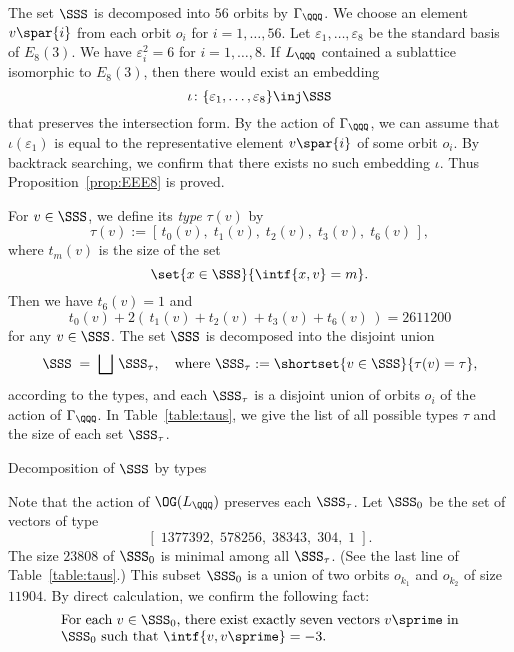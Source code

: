 \documentclass{amsart}
\begin{document}
%
\par
The set $\SSS$  is decomposed into $56$ orbits by $\Gamma_{\QQQ}$.
We choose an element $v\spar{i}$ from each orbit  $o_i$
for $i=1, \dots, 56$.
Let $\varepsilon_1, \dots, \varepsilon_8$ be the standard basis of $E_8(3)$.
We have  $\varepsilon_i^2=6$ for $i=1, \dots, 8$.
If $L_{\QQQ}$ contained a sublattice isomorphic to $E_8(3)$,
then there would exist an embedding
$$
\iota\colon \{\varepsilon_1, \dots, \varepsilon_8\}\inj \SSS
$$
that preserves the intersection form.
By the action of $\Gamma_{\QQQ}$,
we can assume that
$\iota(\varepsilon_1)$ is equal to the representative element $v\spar{i}$ of some orbit $o_i$.
By backtrack searching,
we confirm that there exists no such embedding $\iota$.
Thus Proposition~\ref{prop:EEE8} is proved.
%
%
\par
%
For $v\in \SSS$, we define its \emph{type} $\tau(v)$ by 
$$
\tau(v):=[\,t_0(v), \; t_1(v), \; t_2(v), \; t_3(v), \; t_6(v)\,],
$$
where $t_m(v)$ is the size of the set 
$$
\set{x\in \SSS}{\intf{x, v}=m}.
$$
Then we have $t_6(v)=1$ and 
$$
t_0(v)+2(\, t_1(v)+ t_2(v)+t_3(v) +t_6 (v)\,)=2611200
$$
for any $v\in \SSS$.
The set $\SSS$ is decomposed 
into the disjoint union
$$
\SSS\;=\;\bigsqcup\, \SSS_{\tau}, \quad \textrm{where $\SSS_{\tau}:=\shortset{v\in \SSS}{\tau(v)=\tau}$}, 
$$
according to the types,
and each $\SSS_{\tau}$ is a disjoint union of orbits $o_i$ of the action of $\Gamma_{\QQQ}$.
In Table~\ref{table:taus}, we give the list of all possible types $\tau$
and the size of each set  $\SSS_{\tau}$.
%
%
\begin{table}
{%

}
\vskip 10pt 
\caption{Decomposition of   $\SSS$ by types}\label{table:taus}
\end{table}
%
%
Note that the action of $\OG(L_{\QQQ})$ preserves each $\SSS_{\tau}$.
Let $\SSS_0$ be the set  of vectors of type
$$
[\;1377392, \; 578256, \; 38343, \; 304, \; 1\;].
$$
The size $23808$ of $\SSS_0$ is minimal among all $\SSS_{\tau}$.
(See the last line of Table~\ref{table:taus}.)
This subset $\SSS_0$ is a union of two orbits $o_{k_1}$ and $o_{k_2}$ of size $11904$.
By direct calculation, we confirm the following fact:
%
\begin{equation}\label{eq:seven}
\parbox{10cm}{For each $v\in \SSS_0$, there exist exactly seven vectors $v\sprime$ 
in $\SSS_0$ such that $\intf{v, v\sprime}=-3$.}
\end{equation}
\end{document}
